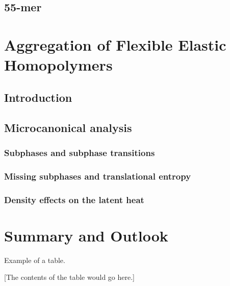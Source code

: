 \documentclass[12pt]{report}
\begin{document}
\section{55-mer}

\chapter{Aggregation of Flexible Elastic Homopolymers}
\section{Introduction}
\section{Microcanonical analysis}
\subsection{Subphases and subphase transitions}
\subsection{Missing subphases and translational entropy}
\subsection{Density effects on the latent heat}

\chapter{Summary and Outlook}







\begin{table}
\caption{Example of a table.}
\centerline{[The contents of the table would go here.]}
\end{table}



\begin{thebibliography}{99}
        
\end{thebibliography}
\end{document}
